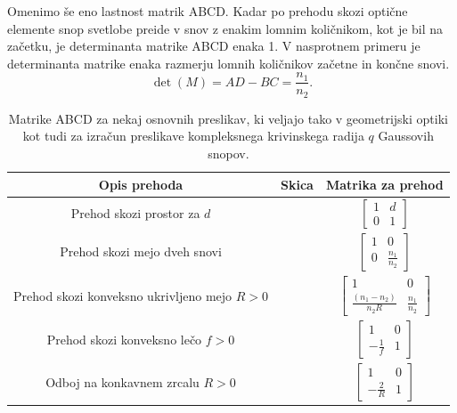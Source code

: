 Omenimo še eno lastnost matrik ABCD. Kadar po prehodu skozi optične elemente snop svetlobe 
preide v snov z enakim lomnim količnikom, kot je bil na začetku, je determinanta matrike 
ABCD enaka 1. V nasprotnem
primeru je determinanta matrike enaka razmerju lomnih količnikov začetne in končne snovi. 
\begin{equation}
\det(M) = AD-BC = \frac{n_1}{n_2}.
\end{equation}
\newpage
\begin{table}[t!]
 \centering
  \begin{tabular}{|c|c|c|} \hline
  Opis prehoda & Skica & Matrika za prehod \\ \hline   
      Prehod skozi prostor za $d$ & \parbox[c]{3cm}{\def\svgwidth{3cm}} & 
      $\begin{bmatrix} 1 & d\\  0 & 1 \end{bmatrix}$ \\ \hline

      Prehod skozi mejo dveh snovi & \parbox[c]{3cm}{\def\svgwidth{3cm}} & 
      $\begin{bmatrix} 1 & 0\\ 0 & \frac{n_{1}}{n_{2}} \end{bmatrix}$ \\ \hline
      
      Prehod skozi konveksno ukrivljeno mejo $R>0$ & \parbox[c]{3cm}{\def\svgwidth{3cm}} & 
      $\begin{bmatrix} 1 & 0\\ \frac{(n_{1}-n_{2})}{n_{2}R} & \frac{n_{1}}{n_{2}} \end{bmatrix}$ \\ \hline
      
      Prehod skozi konveksno lečo $f>0$ & \parbox[c]{3cm}{\def\svgwidth{3cm}} & 
      $\begin{bmatrix} 1 & 0\\ -\frac{1}{f} & 1 \end{bmatrix}$ \\ \hline
      
      Odboj na konkavnem zrcalu $R>0$ & \parbox[c]{3cm}{\def\svgwidth{3cm}} & 
      $\begin{bmatrix} 1 & 0\\ -\frac{2}{R} & 1 \end{bmatrix}$ \\ \hline    
  \end{tabular}
  \caption{Matrike ABCD za nekaj osnovnih preslikav, ki veljajo tako v 
	  geometrijski optiki kot tudi za izračun preslikave kompleksnega
	  krivinskega radija $q$ Gaussovih snopov.}
\label{fig:Matrike-za-preslikave}
\end{table}

